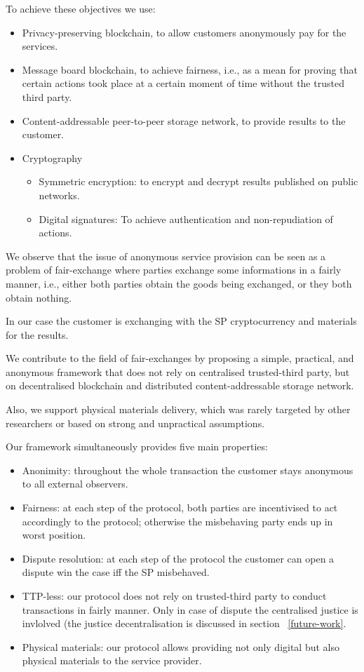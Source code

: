\documentclass{ieeeaccess}
\begin{document}
To achieve these objectives we use:
\begin{itemize}
    \item Privacy-preserving blockchain, to allow customers anonymously pay for the services.
    \item Message board blockchain, to achieve fairness, i.e., as a mean for proving that certain actions took place at a certain moment of time without the trusted third party.
    \item Content-addressable peer-to-peer storage network, to provide results to the customer. 
    \item Cryptography
    \begin{itemize}
        \item Symmetric encryption: to encrypt and decrypt results published on public networks.
        \item Digital signatures: To achieve authentication and non-repudiation of actions. 
    \end{itemize}
    
\end{itemize}

We observe that the issue of anonymous service provision can be seen as a problem of fair-exchange where parties exchange some informations in a fairly manner, i.e., either both parties obtain the goods being exchanged, or they both obtain nothing.

In our case the customer is exchanging with the SP cryptocurrency and materials for the results.

We contribute to the field of fair-exchanges by proposing a simple,
practical, and anonymous framework that does not rely on centralised trusted-third party, but on decentralised blockchain and
distributed content-addressable storage network.

Also, we support physical materials delivery, which was rarely targeted by other researchers or based on strong and unpractical assumptions.

Our framework simultaneously provides five main properties:

\begin{itemize}
\item Anonimity:
throughout the whole transaction the customer stays anonymous to all external observers.
\item Fairness:
at each step of the protocol, both parties are incentivised to act accordingly to the protocol; otherwise the misbehaving party ends up in worst position.
\item Dispute resolution: at each step of the protocol the customer can open a dispute win the case iff the SP misbehaved.
\item TTP-less: 
our protocol does not rely on trusted-third party to conduct transactions in fairly manner. Only in case of dispute the centralised justice is invlolved (the justice decentralisation is discussed in section ~\ref{future-work}.
\item Physical materials: our protocol allows providing not only digital but also physical materials to the service provider.
\end{itemize}
\end{document}
